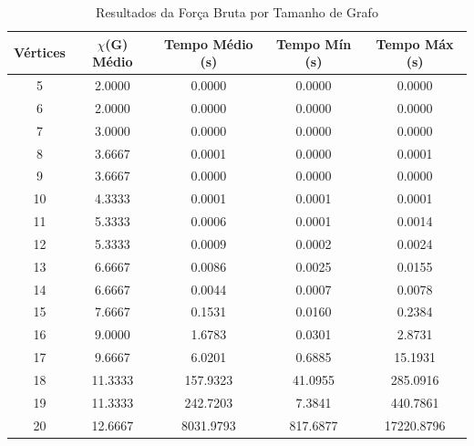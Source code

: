 \begin{table}
\centering
\caption{Resultados da Força Bruta por Tamanho de Grafo}
\label{tab:resultados_forca_bruta_2}
\begin{tabular}{ccccc}
\toprule
Vértices & $\chi$(G) Médio & Tempo Médio (s) & Tempo Mín (s) & Tempo Máx (s) \\
\midrule
5 & 2.0000 & 0.0000 & 0.0000 & 0.0000 \\
6 & 2.0000 & 0.0000 & 0.0000 & 0.0000 \\
7 & 3.0000 & 0.0000 & 0.0000 & 0.0000 \\
8 & 3.6667 & 0.0001 & 0.0000 & 0.0001 \\
9 & 3.6667 & 0.0000 & 0.0000 & 0.0000 \\
10 & 4.3333 & 0.0001 & 0.0001 & 0.0001 \\
11 & 5.3333 & 0.0006 & 0.0001 & 0.0014 \\
12 & 5.3333 & 0.0009 & 0.0002 & 0.0024 \\
13 & 6.6667 & 0.0086 & 0.0025 & 0.0155 \\
14 & 6.6667 & 0.0044 & 0.0007 & 0.0078 \\
15 & 7.6667 & 0.1531 & 0.0160 & 0.2384 \\
16 & 9.0000 & 1.6783 & 0.0301 & 2.8731 \\
17 & 9.6667 & 6.0201 & 0.6885 & 15.1931 \\
18 & 11.3333 & 157.9323 & 41.0955 & 285.0916 \\
19 & 11.3333 & 242.7203 & 7.3841 & 440.7861 \\
20 & 12.6667 & 8031.9793 & 817.6877 & 17220.8796 \\
\bottomrule
\end{tabular}
\end{table}
